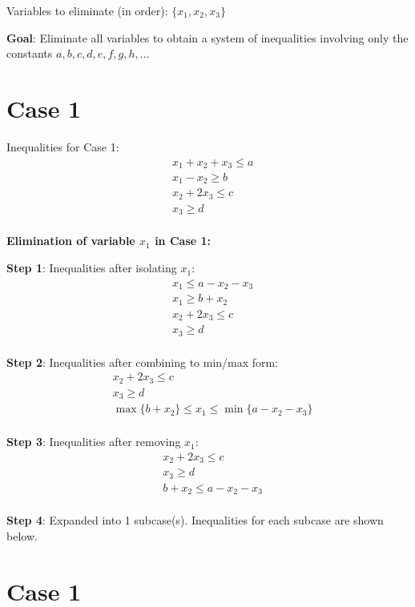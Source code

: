 \documentclass{article}
\begin{document}
Variables to eliminate (in order): $\{x_{1}, x_{2}, x_{3}\}$

\textbf{Goal}: Eliminate all variables to obtain a system of inequalities
involving only the constants $a, b, c, d, e, f, g, h, \ldots$

\section{Case 1}

Inequalities for Case 1:
\begin{align}
& x_{1} + x_{2} + x_{3} \leq a \\
& x_{1} - x_{2} \geq b \\
& x_{2} + 2 x_{3} \leq c \\
& x_{3} \geq d \\
\end{align}

\textbf{Elimination of variable $x_{1}$ in Case 1:}

\textbf{Step 1}: Inequalities after isolating $x_{1}$:
\begin{align}
& x_{1} \leq a - x_{2} - x_{3} \\
& x_{1} \geq b + x_{2} \\
& x_{2} + 2 x_{3} \leq c \\
& x_{3} \geq d \\
\end{align}

\textbf{Step 2}: Inequalities after combining to min/max form:
\begin{align}
& x_{2} + 2 x_{3} \leq c \\
& x_{3} \geq d \\
& \max\{b + x_{2}\} \leq x_{1} \leq \min\{a - x_{2} - x_{3}\} \\
\end{align}

\textbf{Step 3}: Inequalities after removing $x_{1}$:
\begin{align}
& x_{2} + 2 x_{3} \leq c \\
& x_{3} \geq d \\
& b + x_{2} \leq a - x_{2} - x_{3} \\
\end{align}

\textbf{Step 4}: Expanded into 1 subcase(s). Inequalities for each subcase are shown below.

\section{Case 1}
\end{document}
